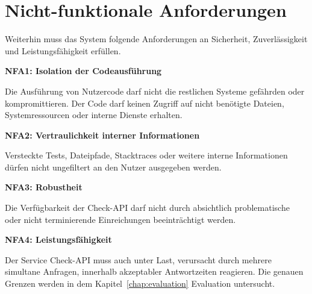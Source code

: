 \section{Nicht-funktionale Anforderungen}
Weiterhin muss das System folgende Anforderungen an Sicherheit, Zuverlässigkeit und Leistungsfähigkeit erfüllen.
\begin{description}

	\item \textbf{NFA1: Isolation der Codeausführung}

	Die Ausführung von Nutzercode darf nicht die restlichen Systeme gefährden oder kompromittieren. Der Code darf keinen Zugriff auf nicht benötigte Dateien, Systemressourcen oder interne Dienste erhalten.

	\item \textbf{NFA2: Vertraulichkeit interner Informationen}

	Versteckte Tests, Dateipfade, Stacktraces oder weitere interne Informationen dürfen nicht ungefiltert an den Nutzer ausgegeben werden.

	\item \textbf{NFA3: Robustheit}

	Die Verfügbarkeit der Check-API darf nicht durch absichtlich problematische oder nicht terminierende Einreichungen beeinträchtigt werden.

	\item \textbf{NFA4: Leistungsfähigkeit}

	Der Service Check-API muss auch unter Last, verursacht durch mehrere simultane Anfragen, innerhalb akzeptabler Antwortzeiten reagieren. Die genauen Grenzen werden in dem Kapitel~\ref{chap:evaluation} Evaluation untersucht.

\end{description}

